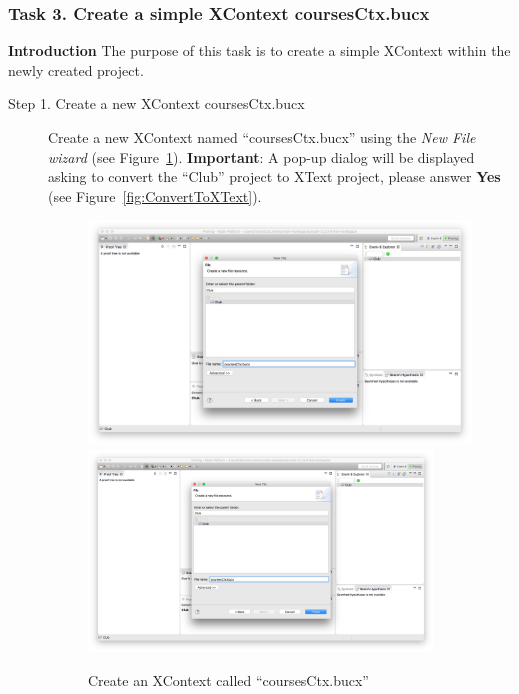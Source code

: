 \subsubsection{Task 3. Create a simple XContext coursesCtx.bucx}\label{Sec:SimpleContext}
\textbf{Introduction} The purpose of this task is to create a simple XContext within the newly created project.
\begin{description}
\item[Step 1. Create a new XContext coursesCtx.bucx] Create a new XContext named ``coursesCtx.bucx'' using the \emph{New File wizard} (see Figure~\ref{fig:CreateCoursesCtx}).
         \textbf{Important}: A pop-up dialog will be displayed asking to convert the ``Club''
         project to XText project, please answer \textbf{Yes} (see Figure~\ref{fig:ConvertToXText}).
\begin{figure}[!htbp]
  \centering
  \ifplastex
  \includegraphics[width=512]{figures/CreateCoursesCtx}
  \else
  \includegraphics[width=0.9\textwidth]{figures/CreateCoursesCtx}
  \fi
  \caption{Create an XContext called ``coursesCtx.bucx''}
  \label{fig:CreateCoursesCtx}
\end{figure}

\end{description}
